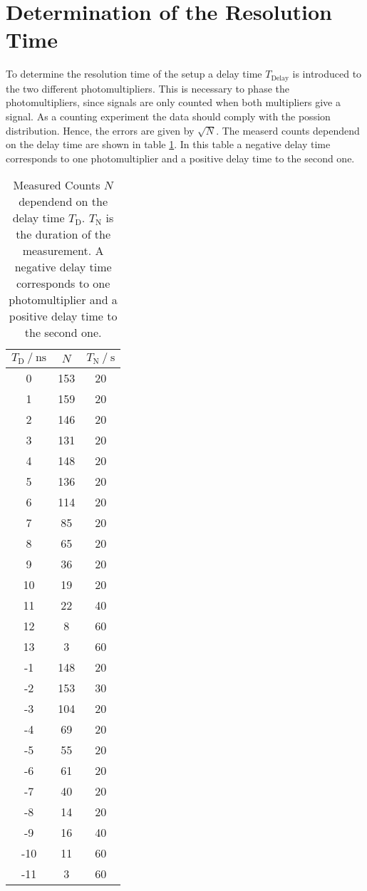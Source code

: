 \section{Determination of the Resolution Time}
\label{sec:resoltion time}
To determine the resolution time of the setup a delay time $T_\mathrm{Delay}$ is introduced to the two different photomultipliers. This is necessary to phase the photomultipliers,
since signals are only counted when both multipliers give a signal. As a counting experiment the data should comply with the possion distribution. Hence, the errors are given 
by $\sqrt{N}$. The measerd counts dependend on the delay time are shown in table \ref{tab:t_d}. In this table a negative delay time corresponds to one photomultiplier and a positive 
delay time to the second one. 

\begin{table}
    \tiny
    \centering
    \caption{Measured Counts $N$ dependend on the delay time $T_\text{D}$. $T_\mathrm{N}$ is the duration of the measurement. A negative delay time corresponds to one photomultiplier
    and a positive delay time to the second one.}
    \label{tab:t_d}
    \begin{tabular}{c c c}
      \toprule
      {$ T_\text{D} \mathbin{/} \unit{\nano\second}$} & {$N$} & {$T_\mathrm{N} \mathbin{/} \unit{\second}$} \\
      \midrule
    0  & 153 & 20 \\
    1  & 159 & 20 \\
    2  & 146 & 20 \\
    3  & 131 & 20 \\
    4  & 148 & 20 \\
    5  & 136 & 20 \\
    6  & 114 & 20 \\
    7  & 85 & 20 \\
    8  & 65 & 20 \\
    9  & 36 & 20 \\
    10 & 19 & 20 \\
    11 & 22 & 40 \\
    12 & 8  & 60 \\
    13 & 3  & 60 \\
    -1 & 148 & 20 \\
    -2 & 153 & 30 \\
    -3 & 104 & 20 \\
    -4 & 69 & 20 \\
    -5 & 55 & 20 \\
    -6 & 61 & 20 \\
    -7 & 40 & 20 \\
    -8 & 14 & 20 \\
    -9 & 16 & 40 \\
    -10& 11 & 60 \\
    -11& 3 & 60 \\
    \bottomrule
    \end{tabular}
\end{table}

